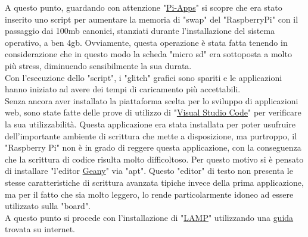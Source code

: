 A questo punto, guardando con attenzione "\href{https://pi-apps.io/}{Pi-Apps}" si scopre che era stato inserito uno script per aumentare la memoria di "swap" del "RaspberryPi" con il passaggio dai 100mb canonici, stanziati durante l'installazione del sistema operativo, a ben 4gb. Ovviamente, questa operazione è stata fatta tenendo in considerazione che in questo modo la scheda "micro sd" era sottoposta a molto più stress, diminuendo sensibilmente la sua durata.\\
Con l'esecuzione dello "script", i "glitch" grafici sono spariti e le applicazioni hanno iniziato ad avere dei tempi di caricamento più accettabili.\\
Senza ancora aver installato la piattaforma scelta per lo sviluppo di applicazioni web, sono state fatte delle prove di utilizzo di "\href{https://code.visualstudio.com/}{Visual Studio Code}" per verificare la sua utilizzabilità. Questa applicazione era stata installata per poter usufruire dell'importante ambiente di scrittura che mette a disposizione, ma purtroppo, il "Raspberry Pi" non è in grado di reggere questa applicazione, con la conseguenza che la scrittura di codice risulta molto difficoltoso. Per questo motivo si è pensato di installare "l'editor \href{https://www.geany.org/}{Geany}" via "apt". Questo "editor" di testo non presenta le stesse caratteristiche di scrittura avanzata tipiche invece della prima applicazione, ma per il fatto che sia molto leggero, lo rende particolarmente idoneo ad essere utilizzato sulla "board".\\
A questo punto si procede con l'installazione di "\href{https://it.wikipedia.org/wiki/LAMP}{LAMP}" utilizzando una \href{https://randomnerdtutorials.com/raspberry-pi-apache-mysql-php-lamp-server/}{guida} trovata su internet. 

